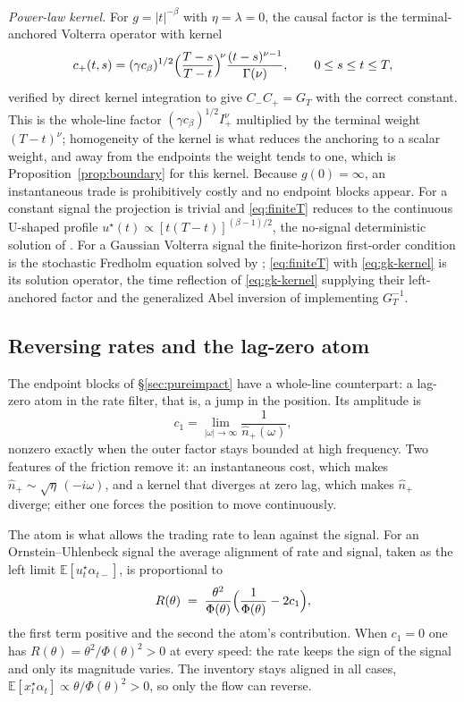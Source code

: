 \documentclass[11pt]{article}
\newcommand{\E}{\mathbb{E}}
\theoremstyle{plain}
\theoremstyle{definition}
\theoremstyle{remark}
\begin{document}
\emph{Power-law kernel.} For $g=|t|^{-\beta}$ with $\eta=\lambda=0$, the causal factor is the terminal-anchored Volterra operator with kernel
\begin{equation}\label{eq:gk-kernel}
c_+(t,s)=(\gamma c_\beta)^{1/2}\Bigl(\frac{T-s}{T-t}\Bigr)^{\!\nu}\frac{(t-s)^{\nu-1}}{\Gamma(\nu)},
\qquad 0\le s\le t\le T,
\end{equation}
verified by direct kernel integration to give $C_-C_+=G_T$ with the correct constant. This is the whole-line factor $(\gamma c_\beta)^{1/2}I^\nu_+$ multiplied by the terminal weight $(T-t)^\nu$; homogeneity of the kernel is what reduces the anchoring to a scalar weight, and away from the endpoints the weight tends to one, which is Proposition~\ref{prop:boundary} for this kernel. Because $g(0)=\infty$, an instantaneous trade is prohibitively costly and no endpoint blocks appear. For a constant signal the projection is trivial and \eqref{eq:finiteT} reduces to the continuous U-shaped profile $u^\star(t)\propto[t(T-t)]^{(\beta-1)/2}$, the no-signal deterministic solution of \citet{GatheralSchiedSlynko2012}. For a Gaussian Volterra signal the finite-horizon first-order condition is the stochastic Fredholm equation solved by \citet{FordeSanchezSmith2022}; \eqref{eq:finiteT} with \eqref{eq:gk-kernel} is its solution operator, the time reflection of \eqref{eq:gk-kernel} supplying their left-anchored factor and the generalized Abel inversion of \citet{ChakrabartiGeorge1994} implementing $G_T^{-1}$.

\subsection{Reversing rates and the lag-zero atom}\label{sec:surfing}

The endpoint blocks of \S\ref{sec:pureimpact} have a whole-line counterpart: a lag-zero atom in the rate filter, that is, a jump in the position. Its amplitude is
\begin{equation}\label{eq:atom}
c_1=\lim_{|\omega|\to\infty}\frac{1}{\hat n_+(\omega)},
\end{equation}
nonzero exactly when the outer factor stays bounded at high frequency. Two features of the friction remove it: an instantaneous cost, which makes $\hat n_+\sim\sqrt\eta\,(-i\omega)$, and a kernel that diverges at zero lag, which makes $\hat n_+$ diverge; either one forces the position to move continuously.

The atom is what allows the trading rate to lean against the signal. For an Ornstein--Uhlenbeck signal the average alignment of rate and signal, taken as the left limit $\E[u^\star_t\alpha_{t-}]$, is proportional to
\begin{equation}\label{eq:surf}
R(\theta)\;=\;\frac{\theta^2}{\Phi(\theta)}\Bigl(\frac{1}{\Phi(\theta)}-2c_1\Bigr),
\end{equation}
the first term positive and the second the atom's contribution. When $c_1=0$ one has $R(\theta)=\theta^2/\Phi(\theta)^2>0$ at every speed: the rate keeps the sign of the signal and only its magnitude varies. The inventory stays aligned in all cases, $\E[x^\star_t\alpha_t]\propto\theta/\Phi(\theta)^2>0$, so only the flow can reverse.
\end{document}
